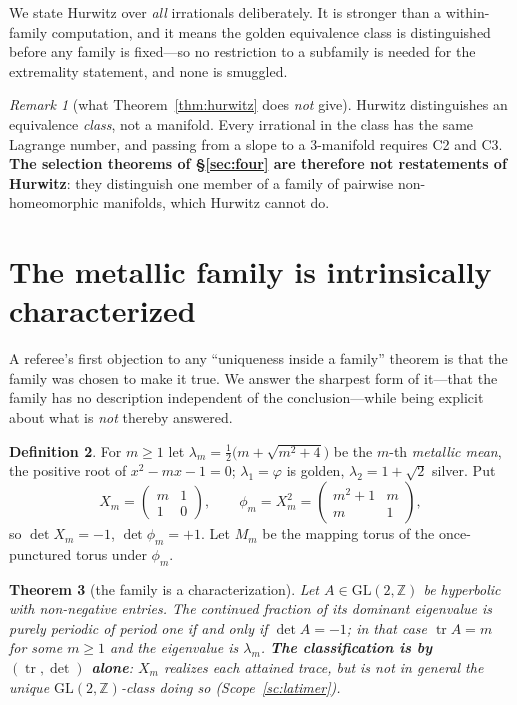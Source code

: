 \documentclass[11pt,reqno]{amsart}
\theoremstyle{plain}
\newtheorem{theorem}{Theorem}[section]
\theoremstyle{definition}
\newtheorem{definition}[theorem]{Definition}
\theoremstyle{remark}
\newtheorem{remark}[theorem]{Remark}
\newcommand{\Z}{\mathbb{Z}}
\newcommand{\GL}{\mathrm{GL}}
\newcommand{\tr}{\operatorname{tr}}
\begin{document}
We state Hurwitz over \emph{all} irrationals deliberately. It is stronger than a
within-family computation, and it means the golden equivalence class is distinguished
before any family is fixed---so no restriction to a subfamily is needed for the
extremality statement, and none is smuggled.

\begin{remark}[what Theorem~\ref{thm:hurwitz} does \emph{not} give]\label{rem:hurwitzlimit}
Hurwitz distinguishes an equivalence \emph{class}, not a manifold. Every irrational in
the class has the same Lagrange number, and passing from a slope to a $3$-manifold
requires C2 and C3. \textbf{The selection theorems of \S\ref{sec:four} are therefore not
restatements of Hurwitz}: they distinguish one member of a family of pairwise
non-homeomorphic manifolds, which Hurwitz cannot do.
\end{remark}

\section{The metallic family is intrinsically characterized}\label{sec:canonical}

A referee's first objection to any ``uniqueness inside a family'' theorem is that the
family was chosen to make it true. We answer the sharpest form of it---that the family
has no description independent of the conclusion---while being explicit about what is
\emph{not} thereby answered.

\begin{definition}
For $m\ge1$ let $\lambda_m=\tfrac12\bigl(m+\sqrt{m^2+4}\bigr)$ be the $m$-th
\emph{metallic mean}, the positive root of $x^2-mx-1=0$; $\lambda_1=\varphi$ is golden,
$\lambda_2=1+\sqrt2$ silver. Put
\[
   X_m=\begin{pmatrix}m&1\\1&0\end{pmatrix},\qquad
   \phi_m=X_m^{2}=\begin{pmatrix}m^2+1&m\\m&1\end{pmatrix},
\]
so $\det X_m=-1$, $\det\phi_m=+1$. Let $M_m$ be the mapping torus of the once-punctured
torus under $\phi_m$.
\end{definition}

\begin{theorem}[the family is a characterization]\label{thm:canonical}
Let $A\in\GL(2,\Z)$ be hyperbolic with non-negative entries. The continued fraction of
its dominant eigenvalue is purely periodic of period one if and only if $\det A=-1$; in
that case $\tr A=m$ for some $m\ge1$ and the eigenvalue is $\lambda_m$. \textbf{The
classification is by $(\tr,\det)$ alone}: $X_m$ realizes each attained trace, but is
\emph{not} in general the unique $\GL(2,\Z)$-class doing so (Scope~\ref{sc:latimer}).
\end{theorem}
\end{document}
